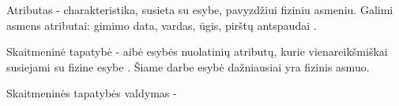 Atributas - charakteristika, susieta su esybe, pavyzdžiui fiziniu asmeniu. Galimi asmens atributai: gimimo data,
vardas, ūgis, pirštų antspaudai \cite{Camp2004}. 

Skaitmeninė tapatybė - aibė esybės nuolatinių atributų, kurie vienareikšmiškai susiejami su fizine esybe \cite{Glasser2009, Camp2004}. Šiame darbe
esybė dažniausiai yra fizinis asmuo.

Skaitmeninės tapatybės valdymas - 